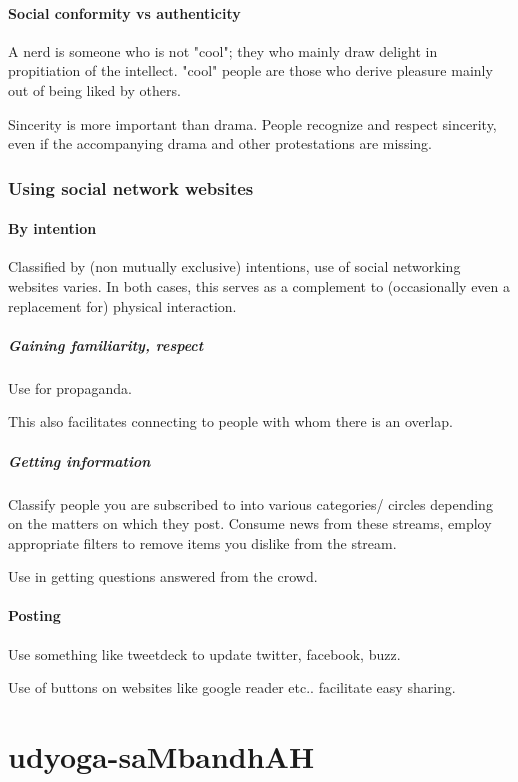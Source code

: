 \documentclass[oneside, article]{memoir}
\begin{document}
\subsection{Social conformity vs authenticity}
A nerd is someone who is not "cool"; they who mainly draw delight in propitiation of the intellect. "cool" people are those who derive pleasure mainly out of being liked by others.

Sincerity is more important than drama. People recognize and respect sincerity, even if the accompanying drama and other protestations are missing.

\section{Using social network websites}
\subsection{By intention}
Classified by (non mutually exclusive) intentions, use of social networking websites varies. In both cases, this serves as a  complement to (occasionally even a replacement for) physical interaction.

\subsubsection{Gaining familiarity, respect}
Use for propaganda.

This also facilitates connecting to people with whom there is an overlap.

\subsubsection{Getting information}
Classify people you are subscribed to into various categories/ circles depending on the matters on which they post. Consume news from these streams, employ appropriate filters to remove items you dislike from the stream.

Use in getting questions answered from the crowd.

\subsection{Posting}
Use something like tweetdeck to update twitter, facebook, buzz.

Use of buttons on websites like google reader etc.. facilitate easy sharing.

\part{udyoga-saMbandhAH}
\end{document}
